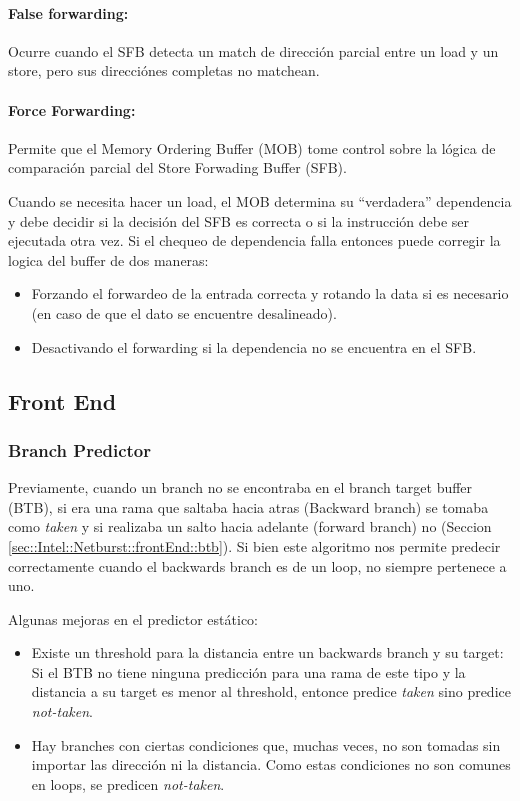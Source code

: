 \paragraph{False forwarding:} Ocurre cuando el SFB detecta un match de dirección parcial entre un load y un store, pero sus direcciónes completas no matchean.

\paragraph{Force Forwarding:} Permite que el Memory Ordering Buffer (MOB) tome control sobre la lógica de comparación parcial del Store Forwading Buffer (SFB).
	
Cuando se necesita hacer un load, el MOB determina su ``verdadera'' dependencia y debe decidir si la decisión del SFB es correcta o si la instrucción debe ser ejecutada otra vez. Si el chequeo de dependencia falla entonces puede corregir la logica del buffer de dos maneras:
	\begin{itemize}
		\item Forzando el forwardeo de la entrada correcta y rotando la data si es necesario (en caso de que el dato se encuentre desalineado).
		\item Desactivando el forwarding si la dependencia no se encuentra en el SFB.
	\end{itemize}
\subsection{Front End}
\subsubsection{Branch Predictor}
Previamente, cuando un branch no se encontraba en el branch target buffer (BTB), si era una rama que saltaba hacia atras (Backward branch) se tomaba como \textit{taken} y si realizaba un salto hacia adelante (forward branch) no
 (Seccion \ref{sec::Intel::Netburst::frontEnd::btb}). Si bien este algoritmo nos permite predecir correctamente cuando el backwards branch es de un loop, no siempre pertenece a uno.

Algunas mejoras en el predictor estático:
\begin{itemize}
	\item Existe un threshold para la distancia entre un backwards branch y su target: Si el BTB no tiene ninguna predicción para una rama de este tipo y la distancia a su target es menor al threshold, entonce predice \textit{taken} sino predice \textit{not-taken}.
	\item Hay branches con ciertas condiciones que, muchas veces, no son tomadas sin importar las dirección ni la distancia. Como estas condiciones no son comunes en loops, se predicen \textit{not-taken}.
\end{itemize}

